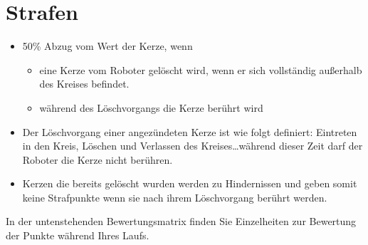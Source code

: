 \documentclass[a4paper,12pt]{article}
\begin{document}
\section{Strafen}
\begin{itemize}
	\item 50\% Abzug vom Wert der Kerze, wenn
	\begin{itemize}
		\item eine Kerze vom Roboter gelöscht wird, wenn er sich
			vollständig außerhalb des Kreises befindet.
		\item während des Löschvorgangs die Kerze berührt wird
	\end{itemize}
	\item Der Löschvorgang einer angezündeten Kerze ist wie folgt
		definiert: Eintreten in den Kreis, Löschen und Verlassen des
		Kreises\ldots während dieser Zeit darf der Roboter die Kerze
		nicht berühren.
	\item Kerzen die bereits gelöscht wurden werden zu Hindernissen und
		geben somit keine Strafpunkte wenn sie nach ihrem Löschvorgang
		berührt werden.
\end{itemize}
In der untenstehenden Bewertungsmatrix finden Sie Einzelheiten zur Bewertung
der Punkte während Ihres Laufs.
\end{document}
